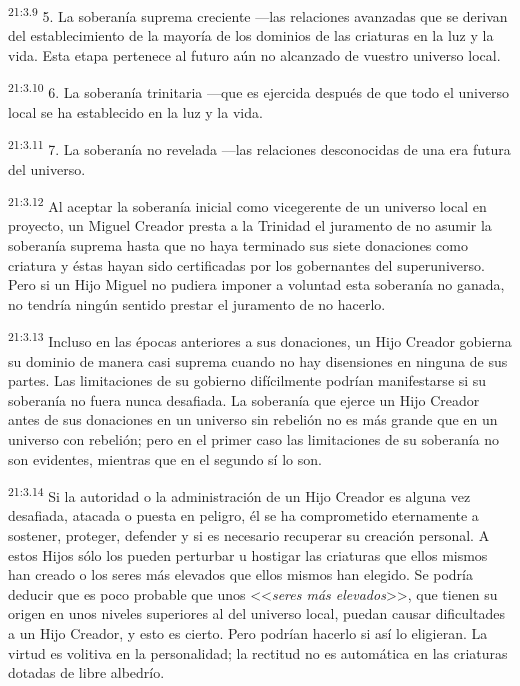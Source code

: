 \par
\textsuperscript{21:3.9} 5. La soberanía suprema creciente ---las relaciones avanzadas que se derivan del establecimiento de la mayoría de los dominios de las criaturas en la luz y la vida. Esta etapa pertenece al futuro aún no alcanzado de vuestro universo local.

\par
\textsuperscript{21:3.10} 6. La soberanía trinitaria ---que es ejercida después de que todo el universo local se ha establecido en la luz y la vida.

\par
\textsuperscript{21:3.11} 7. La soberanía no revelada ---las relaciones desconocidas de una era futura del universo.

\par
\textsuperscript{21:3.12} Al aceptar la soberanía inicial como vicegerente de un universo local en proyecto, un Miguel Creador presta a la Trinidad el juramento de no asumir la soberanía suprema hasta que no haya terminado sus siete donaciones como criatura y éstas hayan sido certificadas por los gobernantes del superuniverso. Pero si un Hijo Miguel no pudiera imponer a voluntad esta soberanía no ganada, no tendría ningún sentido prestar el juramento de no hacerlo.

\par
\textsuperscript{21:3.13} Incluso en las épocas anteriores a sus donaciones, un Hijo Creador gobierna su dominio de manera casi suprema cuando no hay disensiones en ninguna de sus partes. Las limitaciones de su gobierno difícilmente podrían manifestarse si su soberanía no fuera nunca desafiada. La soberanía que ejerce un Hijo Creador antes de sus donaciones en un universo sin rebelión no es más grande que en un universo con rebelión; pero en el primer caso las limitaciones de su soberanía no son evidentes, mientras que en el segundo sí lo son.

\par
\textsuperscript{21:3.14} Si la autoridad o la administración de un Hijo Creador es alguna vez desafiada, atacada o puesta en peligro, él se ha comprometido eternamente a sostener, proteger, defender y si es necesario recuperar su creación personal. A estos Hijos sólo los pueden perturbar u hostigar las criaturas que ellos mismos han creado o los seres más elevados que ellos mismos han elegido. Se podría deducir que es poco probable que unos <<\textit{seres más elevados}>>, que tienen su origen en unos niveles superiores al del universo local, puedan causar dificultades a un Hijo Creador, y esto es cierto. Pero podrían hacerlo si así lo eligieran. La virtud es volitiva en la personalidad; la rectitud no es automática en las criaturas dotadas de libre albedrío.

